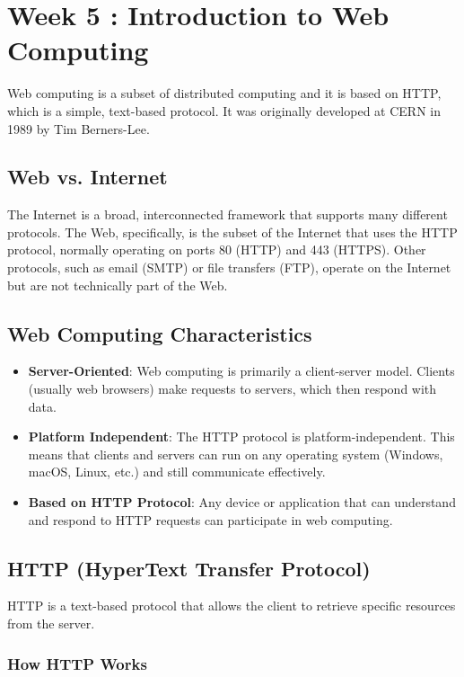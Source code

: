 \section{Week 5 : Introduction to Web Computing}
Web computing is a subset of distributed computing and it is based on HTTP, which is a simple, text-based protocol. It was originally developed at CERN in 1989 by Tim Berners-Lee.

\subsection{Web vs. Internet}
The Internet is a broad, interconnected framework that supports many different protocols. The Web, specifically, is the subset of the Internet that uses the HTTP protocol, normally operating on ports 80 (HTTP) and 443 (HTTPS). Other protocols, such as email (SMTP) or file transfers (FTP), operate on the Internet but are not technically part of the Web.

\subsection{Web Computing Characteristics}
\begin{itemize}
    \item \textbf{Server-Oriented}: Web computing is primarily a client-server model. Clients (usually web browsers) make requests to servers, which then respond with data.
    \item \textbf{Platform Independent}: The HTTP protocol is platform-independent. This means that clients and servers can run on any operating system (Windows, macOS, Linux, etc.) and still communicate effectively.
    \item \textbf{Based on HTTP Protocol}: Any device or application that can understand and respond to HTTP requests can participate in web computing.
\end{itemize}

\subsection{HTTP (HyperText Transfer Protocol)}

HTTP is a text-based protocol that allows the client to retrieve specific resources from the server.

\subsubsection{How HTTP Works}

